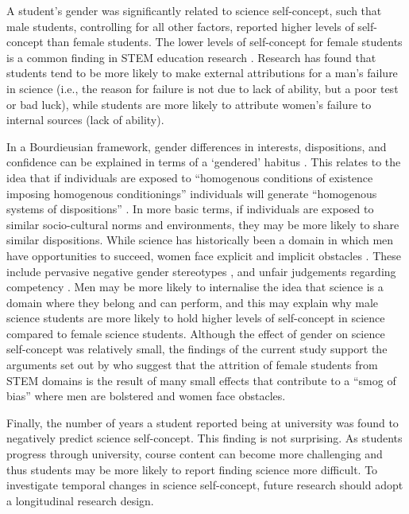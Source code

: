 A student's gender was significantly related to science self-concept, such that male students, controlling for all other factors, reported higher levels of self-concept than female students. The lower levels of self-concept for female students is a common finding in STEM education research \cite{sax2015but,Ellis_2016}. Research has found that students tend to be more likely to make external attributions for a man's failure in science (i.e., the reason for failure is not due to lack of ability, but a poor test or bad luck), while students are more likely to attribute women's failure to internal sources (lack of ability)\cite{LaCosse_2016}. 

In a Bourdieusian framework, gender differences in interests, dispositions, and confidence can be explained in terms of a `gendered' habitus \cite{Reay_2004}. This relates to the idea that if individuals are exposed to ``homogenous conditions of existence imposing homogenous conditionings'' individuals will generate ``homogenous systems of dispositions'' \cite[p.101]{Bourdieu1984}. In more basic terms, if individuals are exposed to similar socio-cultural norms and environments, they may be more likely to share similar dispositions. While science has historically been a domain in which men have opportunities to succeed, women face explicit and implicit obstacles \cite{cheryan2017some,Blickenstaff_2005}. These include pervasive negative gender stereotypes \cite{Nosek_2009}, and unfair judgements regarding competency \cite{Moss_2012,Barthelemy_2016}. Men may be more likely to internalise the idea that science is a domain where they belong and can perform, and this may explain why male science students are more likely to hold higher levels of self-concept in science compared to female science students. Although the effect of gender on science self-concept was relatively small, the findings of the current study support the arguments set out by \cite{Kost_Smith_2010} who suggest that the attrition of female students from STEM domains is the result of many small effects that contribute to a ``smog of bias'' where men are bolstered and women face obstacles. 

Finally, the number of years a student reported being at university was found to negatively predict science self-concept. This finding is not surprising. As students progress through university, course content can become more challenging and thus students may be more likely to report finding science more difficult. To investigate temporal changes in science self-concept, future research should adopt a longitudinal research design. 

